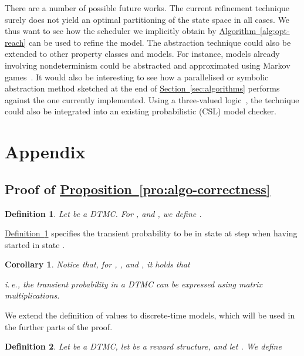 \documentclass[10pt,twocolumn]{article}
\newtheorem{definition}{Definition}
\newtheorem{corollary}{Corollary}
\newcommand{\refsec}[1]{\texorpdfstring{\hyperref[sec:#1]{Section~\ref*{sec:#1}}}{Section~\ref*{sec:#1}}}
\newcommand{\refdef}[1]{\texorpdfstring{\hyperref[def:#1]{Definition~\ref*{def:#1}}}{Definition \ref*{def:#1}}}
\newcommand{\refpro}[1]{\texorpdfstring{\hyperref[pro:#1]{Proposition~\ref*{pro:#1}}}{Proposition~\ref*{pro:#1}}}
\newcommand{\refalg}[1]{\texorpdfstring{\hyperref[alg:#1]{Algorithm~\ref*{alg:#1}}}{Algorithm~\ref*{alg:#1}}}
\begin{document}
There are a number of possible future works.
The current refinement technique surely does not yield an optimal partitioning of the state space in all cases.
We thus want to see how the scheduler we implicitly obtain by \refalg{opt-reach} can be used to refine the model.
The abstraction technique could also be extended to other property classes and models.
For instance, models already involving nondeterminism could be abstracted and approximated using Markov games~\cite{BrazdilFKKK09,RabeS10,RabeS11}.
It would also be interesting to see how a parallelised or symbolic abstraction method sketched at the end of \refsec{algorithms} performs against the one currently implemented.
Using a three-valued logic~\cite{Klink10}, the technique could also be integrated into an existing probabilistic (CSL) model checker.

\balance

\clearpage

\section*{Appendix}

\label{appendices}

\subsection*{Proof of \refpro{algo-correctness}}
\label{apx:algo-correctness}




\begin{definition}
  \label{def:transprobsksp}
Let  be a DTMC.
  For , and , we define .
\end{definition}
\refdef{transprobsksp} specifies the transient probability to be in state  at step  when having started in state .
\begin{corollary}
\label{cor:tprob-matrix}
Notice that, for , , and , it holds that

i.\,e., the transient probability in a DTMC can be expressed using matrix multiplications.
\end{corollary}

We extend the definition of values to discrete-time models, which will be used in the further parts of the proof.
\begin{definition}
\label{def:disc-value}
  Let  be a DTMC, let  be a reward structure, and let .
  We define

\end{definition}
\end{document}
